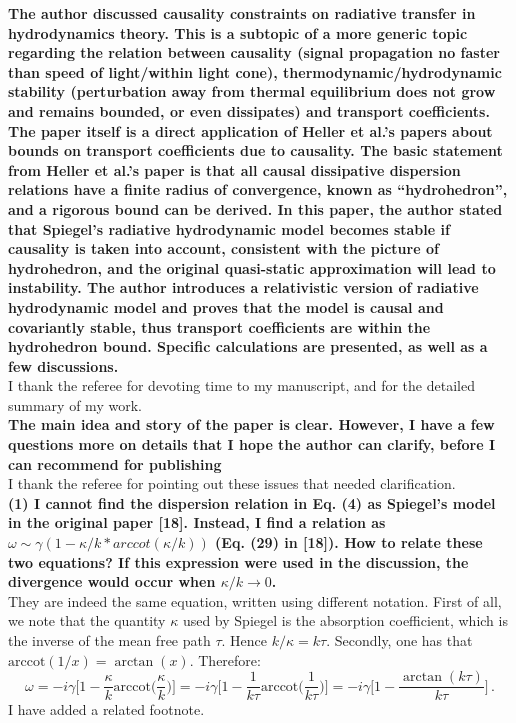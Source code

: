 \documentclass[PRD,onecolumn, nofootinbib]{revtex4-1}
\begin{document}
{\bf The author discussed causality constraints on radiative transfer in
hydrodynamics theory. This is a subtopic of a more generic topic regarding the
relation between causality (signal propagation no faster than speed of
light/within light cone), thermodynamic/hydrodynamic stability (perturbation
away from thermal equilibrium does not grow and remains bounded, or even
dissipates) and transport coefficients. The paper itself is a direct application
of Heller et al.'s papers about bounds on transport coefficients due to
causality. The basic statement from Heller et al.'s paper is that all causal
dissipative dispersion relations have a finite radius of convergence, known as
``hydrohedron'', and a rigorous bound can be derived. In this paper, the author
stated that Spiegel's radiative hydrodynamic model becomes stable if causality
is taken into account, consistent with the picture of hydrohedron, and the
original quasi-static approximation will lead to instability. The author
introduces a relativistic version of radiative hydrodynamic model and proves
that the model is causal and covariantly stable, thus transport coefficients are
within the hydrohedron bound. Specific calculations are presented, as well as a
few discussions.}\\

I thank the referee for devoting time to my manuscript, and for the detailed summary of my work.\\



{\bf The main idea and story of the paper is clear. However, I have a few questions
more on details that I hope the author can clarify, before I can recommend for
publishing}\\

I thank the referee for pointing out these issues that needed clarification.\\

{\bf (1) I cannot find the dispersion relation in Eq. (4) as Spiegel's model in the
original paper [18]. Instead, I find a relation as $\omega\sim
\gamma(1-\kappa/k*arccot(\kappa/k))$ (Eq. (29) in [18]). How to relate these two
equations? If this expression were used in the discussion, the divergence would
occur when $\kappa/k\to 0$.}\\

They are indeed the same equation, written using different notation. First of all, we note that the quantity $\kappa$ used by Spiegel is the absorption coefficient, which is the inverse of the mean free path $\tau$. Hence $k/\kappa=k\tau$. Secondly, one has that $\text{arccot}(1/x)=\arctan(x)$. Therefore:
\begin{equation}
\omega=-i\gamma \bigg[1-\dfrac{\kappa}{k} \text{arccot} \bigg( \dfrac{\kappa}{k}\bigg) \bigg]=-i\gamma \bigg[1-\dfrac{1}{k\tau} \text{arccot} \bigg( \dfrac{1}{k\tau}\bigg) \bigg]= -i\gamma \bigg[1-\dfrac{\arctan(k\tau)}{k\tau} \bigg]\, .
\end{equation}
I have added a related footnote.\\
\end{document}

